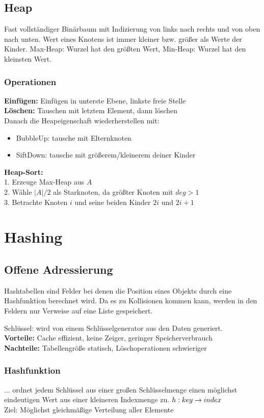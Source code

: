 \documentclass[fs, footer]{latex4ei}
\begin{document}
\begin{multicols*}{4}
{{\subsection{Heap}
Fast vollständiger Binärbaum mit Indizierung von links nach rechts und von oben nach unten.
Wert eines Knotens ist immer kleiner bzw. größer als Werte der Kinder. 
Max-Heap: Wurzel hat den größten Wert, Min-Heap: Wurzel hat den kleinsten Wert.\\
\subsubsection{Operationen}
\textbf{Einfügen:} Einfügen in unterste Ebene, linkste freie Stelle\\
\textbf{Löschen:} Tauschen mit letztem Element, dann löschen\\
Danach die Heapeigenschaft wiederherstellen mit:
\begin{itemize}
	\item BubbleUp: tausche mit Elternknoten
	\item SiftDown: tausche mit größerem/kleinerem deiner Kinder
\end{itemize}

\textbf{Heap-Sort:}\\
1. Erzeuge Max-Heap aus $A$\\
2. Wähle $|A| / 2$ als Starknoten, da größter Knoten mit $deg > 1$\\
3. Betrachte Knoten $i$ und seine beiden Kinder $2i$ und $2i+1$ \\

\section{Hashing}
\subsection{Offene Adressierung}
	Hashtabellen sind Felder bei denen die Position eines Objekts durch eine Hashfunktion berechnet wird. Da es zu Kollisionen kommen kann, werden in den Feldern nur Verweise auf eine Liste gespeichert.

	Schlüssel: wird von einem Schlüsselgenerator aus den Daten generiert. \\
	\textbf{Vorteile:} Cache effizient, keine Zeiger, geringer Speicherverbrauch \\
	\textbf{Nachteile:} Tabellengröße statisch, Löschoperationen schwieriger
\subsubsection{Hashfunktion}
	... ordnet jedem Schlüssel aus einer großen Schlüsselmenge einen möglichst eindeutigen Wert aus einer kleineren Indexmenge zu.
	$h: key \rightarrow index$\\
	Ziel: Möglichst gleichmäßige Verteilung aller Elemente\\
	
}}
\end{multicols*}
\end{document}
